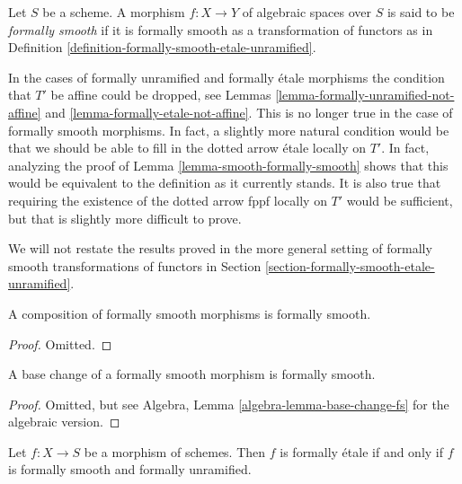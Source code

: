 \begin{definition}
\label{definition-formally-smooth}
Let $S$ be a scheme. A morphism $f : X \to Y$ of algebraic spaces over $S$
is said to be {\it formally smooth} if it is formally smooth as a
transformation of functors as in
Definition \ref{definition-formally-smooth-etale-unramified}.
\end{definition}

\noindent
In the cases of formally unramified and formally \'etale morphisms
the condition that $T'$ be affine could be dropped, see
Lemmas \ref{lemma-formally-unramified-not-affine} and
\ref{lemma-formally-etale-not-affine}.
This is no longer true in the case of formally smooth morphisms.
In fact, a slightly more natural condition would be that we should be
able to fill in the dotted arrow \'etale locally on $T'$.
In fact, analyzing the proof of
Lemma \ref{lemma-smooth-formally-smooth}
shows that this would be equivalent to the definition as it currently
stands. It is also true that requiring the existence of the dotted
arrow fppf locally on $T'$ would be sufficient, but that is slightly
more difficult to prove.

\medskip\noindent
We will not restate the results proved in the more general setting of
formally smooth transformations of functors in
Section \ref{section-formally-smooth-etale-unramified}.

\begin{lemma}
\label{lemma-composition-formally-smooth}
A composition of formally smooth morphisms is formally smooth.
\end{lemma}

\begin{proof}
Omitted.
\end{proof}

\begin{lemma}
\label{lemma-base-change-formally-smooth}
A base change of a formally smooth morphism is formally smooth.
\end{lemma}

\begin{proof}
Omitted, but see
Algebra, Lemma \ref{algebra-lemma-base-change-fs}
for the algebraic version.
\end{proof}

\begin{lemma}
\label{lemma-formally-etale-unramified-smooth}
Let $f : X \to S$ be a morphism of schemes.
Then $f$ is formally \'etale if and only if
$f$ is formally smooth and formally unramified.
\end{lemma}

